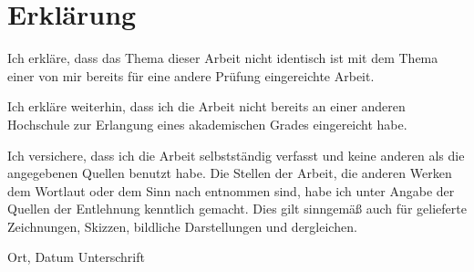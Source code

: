 \section*{Erklärung}

Ich erkläre, dass das Thema dieser Arbeit nicht identisch ist mit dem Thema einer von mir bereits für eine andere Prüfung eingereichte Arbeit.\par
Ich erkläre weiterhin, dass ich die Arbeit nicht bereits an einer anderen Hochschule zur Erlangung eines akademischen Grades eingereicht habe.\par
\vspace{2cm}
Ich versichere, dass ich die Arbeit selbstständig verfasst und keine anderen als die angegebenen Quellen benutzt habe.
Die Stellen der Arbeit, die anderen Werken dem Wortlaut oder dem Sinn nach entnommen sind, habe ich unter Angabe der Quellen der Entlehnung kenntlich gemacht.
Dies gilt sinngemä{\ss} auch für gelieferte Zeichnungen, Skizzen, bildliche Darstellungen und dergleichen.

\vfill

\hspace{2cm} Ort, Datum \hfill Unterschrift \hspace{2cm}